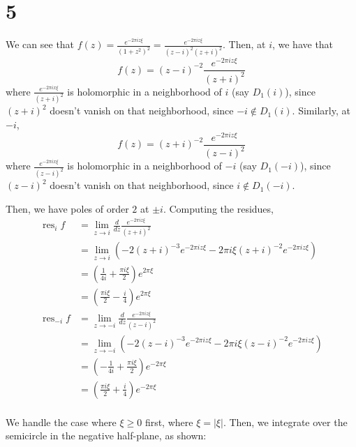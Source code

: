 \documentclass[12pt,letterpaper]{article}
\theoremstyle{definition}
\DeclareMathOperator{\res}{res}
\newcommand{\incfig}[1]{}
\begin{document}
\section*{5}

We can see that $f(z) = \frac{e^{-2\pi i z \xi}}{(1+z^{2})^{2}} = \frac{e^{-2\pi i z \xi}}{(z-i)^{2}(z+i)^{2}}$. Then, at $i$, we have that
\[
  f(z) = (z-i)^{-2}\frac{e^{-2\pi i z \xi}}{(z+i)^{2}}
\]
where $\frac{e^{-2\pi i x \xi}}{(z+i)^{2}}$ is holomorphic in a neighborhood of $i$ (say $D_{1}(i)$), since $(z+i)^{2}$ doesn't vanish on that neighborhood, since $-i \notin D_{1}(i)$. Similarly, at $-i$,
\[
  f(z) = (z+i)^{-2}\frac{e^{-2\pi i z \xi}}{(z-i)^{2}}
\]
where $\frac{e^{-2\pi i x \xi}}{(z-i)^{2}}$ is holomorphic in a neighborhood of $-i$ (say $D_{1}(-i)$), since $(z-i)^{2}$ doesn't vanish on that neighborhood, since $i \notin D_{1}(-i)$.

Then, we have poles of order $2$ at $\pm i$. Computing the residues,
\begin{align*}
  \res_{i}f &= \lim_{z \rightarrow i}\frac{d}{dz}\frac{e^{-2\pi i z \xi}}{(z+i)^{2}} \\
            &= \lim_{z \rightarrow i}\left(-2(z+i)^{-3}e^{-2\pi i z \xi} - 2\pi i \xi(z+i)^{-2}e^{-2\pi i z \xi}\right) \\
            &= \left(\frac{1}{4i} + \frac{\pi i \xi}{2}\right)e^{2\pi\xi} \\
            &= \left(\frac{\pi i \xi}{2} - \frac{i}{4}\right)e^{2\pi\xi} \\
  \res_{-i}f &= \lim_{z \rightarrow -i}\frac{d}{dz}\frac{e^{-2\pi i z \xi}}{(z-i)^{2}} \\
            &= \lim_{z \rightarrow -i}\left(-2(z-i)^{-3}e^{-2\pi i z \xi} - 2\pi i \xi(z-i)^{-2}e^{-2\pi i z \xi}\right) \\
            &= \left(-\frac{1}{4i} + \frac{\pi i \xi}{2}\right)e^{-2\pi\xi} \\
            &= \left(\frac{\pi i \xi}{2} + \frac{i}{4}\right)e^{-2\pi\xi} \\
\end{align*}

We handle the case where $\xi \geq 0$ first, where $\xi = |\xi|$. Then, we integrate over the semicircle in the negative half-plane, as shown:

\begin{figure}[H]
  \centering
  \incfig{problem31}
\end{figure}
\end{document}
